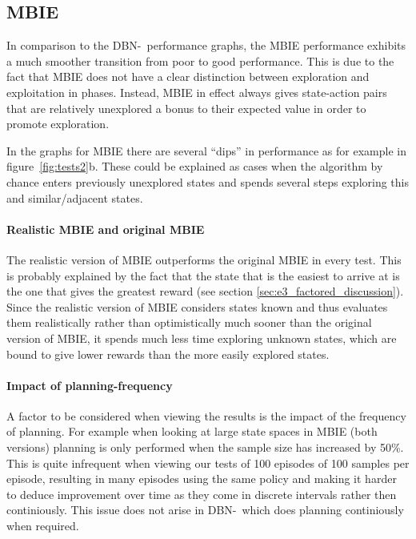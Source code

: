 \subsection{MBIE }
In comparison to the DBN-\etre\ performance graphs, the MBIE performance exhibits a much smoother transition from poor to good performance. This is due to the fact that MBIE does not have a clear distinction between exploration and exploitation in phases. Instead, MBIE in effect always gives state-action pairs that are relatively unexplored a bonus to their expected value in order to promote exploration.  

In the graphs for MBIE there are several ``dips'' in performance as for example in figure~\ref{fig:tests2}b. These could be explained as cases when the algorithm by chance enters previously unexplored states and spends several steps exploring this and similar/adjacent states. 

\paragraph{Realistic MBIE and original MBIE}
The realistic version of MBIE outperforms the original MBIE in every test. This is probably explained by the fact that the state that is the easiest to arrive at is the one that gives the greatest reward (see section \ref{sec:e3_factored_discussion}). Since the realistic version of MBIE considers states known and thus evaluates them  realistically rather than optimistically much sooner than the original version of MBIE, it spends much less time exploring unknown states, which are bound to give lower rewards than the more easily explored states. 

\paragraph{Impact of planning-frequency}
A factor to be considered when viewing the results is the impact of the frequency of planning. For example when looking at large state spaces in MBIE (both versions) planning is only performed when the sample size has increased by 50\%. This is quite infrequent when viewing our tests of 100 episodes of 100 samples per episode, resulting in many episodes using the same policy and making it harder to deduce improvement over time as they come in discrete intervals rather then continiously. This issue does not arise in DBN-\etre\ which does planning continiously when required.    


